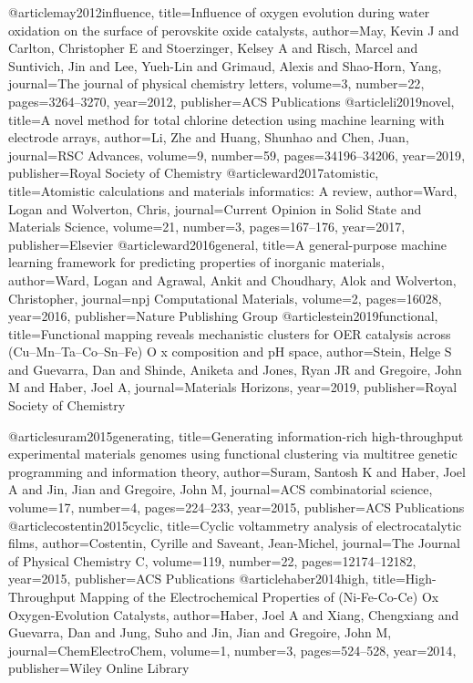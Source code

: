 @article{may2012influence,
  title={Influence of oxygen evolution during water oxidation on the surface of perovskite oxide catalysts},
  author={May, Kevin J and Carlton, Christopher E and Stoerzinger, Kelsey A and Risch, Marcel and Suntivich, Jin and Lee, Yueh-Lin and Grimaud, Alexis and Shao-Horn, Yang},
  journal={The journal of physical chemistry letters},
  volume={3},
  number={22},
  pages={3264--3270},
  year={2012},
  publisher={ACS Publications}
}
@article{li2019novel,
  title={A novel method for total chlorine detection using machine learning with electrode arrays},
  author={Li, Zhe and Huang, Shunhao and Chen, Juan},
  journal={RSC Advances},
  volume={9},
  number={59},
  pages={34196--34206},
  year={2019},
  publisher={Royal Society of Chemistry}
}
@article{ward2017atomistic,
  title={Atomistic calculations and materials informatics: A review},
  author={Ward, Logan and Wolverton, Chris},
  journal={Current Opinion in Solid State and Materials Science},
  volume={21},
  number={3},
  pages={167--176},
  year={2017},
  publisher={Elsevier}
}
@article{ward2016general,
  title={A general-purpose machine learning framework for predicting properties of inorganic materials},
  author={Ward, Logan and Agrawal, Ankit and Choudhary, Alok and Wolverton, Christopher},
  journal={npj Computational Materials},
  volume={2},
  pages={16028},
  year={2016},
  publisher={Nature Publishing Group}
}
@article{stein2019functional,
  title={Functional mapping reveals mechanistic clusters for OER catalysis across (Cu--Mn--Ta--Co--Sn--Fe) O x composition and pH space},
  author={Stein, Helge S and Guevarra, Dan and Shinde, Aniketa and Jones, Ryan JR and Gregoire, John M and Haber, Joel A},
  journal={Materials Horizons},
  year={2019},
  publisher={Royal Society of Chemistry}
}

@article{suram2015generating,
  title={Generating information-rich high-throughput experimental materials genomes using functional clustering via multitree genetic programming and information theory},
  author={Suram, Santosh K and Haber, Joel A and Jin, Jian and Gregoire, John M},
  journal={ACS combinatorial science},
  volume={17},
  number={4},
  pages={224--233},
  year={2015},
  publisher={ACS Publications}
}
@article{costentin2015cyclic,
  title={Cyclic voltammetry analysis of electrocatalytic films},
  author={Costentin, Cyrille and Saveant, Jean-Michel},
  journal={The Journal of Physical Chemistry C},
  volume={119},
  number={22},
  pages={12174--12182},
  year={2015},
  publisher={ACS Publications}
}
@article{haber2014high,
  title={High-Throughput Mapping of the Electrochemical Properties of (Ni-Fe-Co-Ce) Ox Oxygen-Evolution Catalysts},
  author={Haber, Joel A and Xiang, Chengxiang and Guevarra, Dan and Jung, Suho and Jin, Jian and Gregoire, John M},
  journal={ChemElectroChem},
  volume={1},
  number={3},
  pages={524--528},
  year={2014},
  publisher={Wiley Online Library}
}

